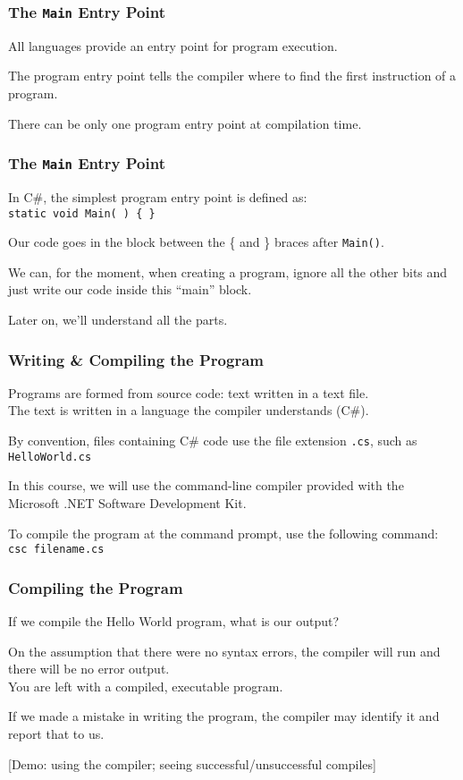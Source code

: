 \begin{frame}
\frametitle{The \texttt{Main} Entry Point}

All languages provide an entry point for program execution.

The \alert{program entry point}  tells the compiler where to find the first instruction of a program.

There can be only one program entry point at compilation time.

\end{frame}

\begin{frame}
\frametitle{The \texttt{Main} Entry Point}


In C\#, the simplest program entry point is defined as:\\
\quad	\texttt{static void Main( ) \{ \}}

Our code goes in the block between the \{ and \} braces after \texttt{Main()}.

We can, for the moment, when creating a program, ignore all the other bits and just write our code inside this ``main'' block.

Later on, we'll understand all the parts.

\end{frame}

\begin{frame}
\frametitle{Writing \& Compiling the Program}
Programs are formed from source code: text written in a text file.\\
\quad The text is written in a language the compiler understands (C\#).

By convention,  files containing C\# code use the file extension \texttt{.cs}, such as \texttt{HelloWorld.cs}

In this course, we will use the command-line compiler provided with the Microsoft .NET Software Development Kit.

To compile the program at the command prompt, use the following command:\\
\quad \texttt{csc filename.cs}

\end{frame}

\begin{frame}
\frametitle{Compiling the Program}

If we compile the Hello World program, what is our output?

On the assumption that there were no syntax errors, the compiler will run and there will be no error output.\\
\quad You are left with a compiled, executable program.

If we made a mistake in writing the program, the compiler may identify it and report that to us.

[Demo: using the compiler; seeing successful/unsuccessful compiles]

\end{frame}


